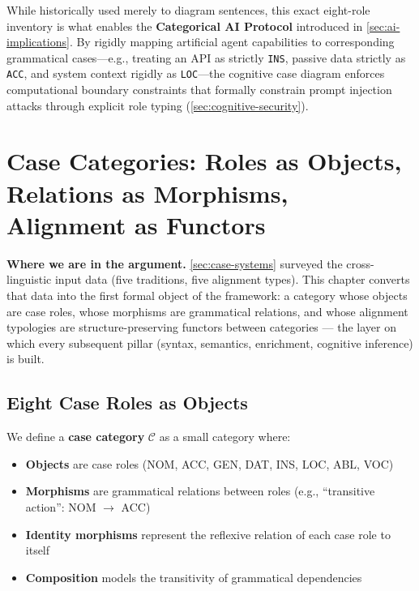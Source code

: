 \documentclass[
]{article}
\providecommand{\tightlist}{%
  \setlength{\itemsep}{0pt}\setlength{\parskip}{0pt}}
\begin{document}
While historically used merely to diagram sentences, this exact
eight-role inventory is what enables the \textbf{Categorical AI
Protocol} introduced in \autoref{sec:ai-implications}. By rigidly
mapping artificial agent capabilities to corresponding grammatical
cases---e.g., treating an API as strictly \texttt{INS}, passive data
strictly as \texttt{ACC}, and system context rigidly as
\texttt{LOC}---the cognitive case diagram enforces computational
boundary constraints that formally constrain prompt injection attacks
through explicit role typing (\autoref{sec:cognitive-security}).

\newpage

\section{Case Categories: Roles as Objects, Relations as Morphisms,
Alignment as Functors}\label{sec:case-categories}

\textbf{Where we are in the argument.} \autoref{sec:case-systems}
surveyed the cross-linguistic input data (five traditions, five
alignment types). This chapter converts that data into the first formal
object of the framework: a category whose objects are case roles, whose
morphisms are grammatical relations, and whose alignment typologies are
structure-preserving functors between categories --- the layer on which
every subsequent pillar (syntax, semantics, enrichment, cognitive
inference) is built.

\subsection{Eight Case Roles as
Objects}\label{eight-case-roles-as-objects}

We define a \textbf{case category} \(\mathcal{C}\) as a small category
where:

\begin{itemize}
\tightlist
\item
  \textbf{Objects} are case roles (NOM, ACC, GEN, DAT, INS, LOC, ABL,
  VOC)
\item
  \textbf{Morphisms} are grammatical relations between roles (e.g.,
  ``transitive action'': NOM \texorpdfstring{\ensuremath{\to}}{->} ACC)
\item
  \textbf{Identity morphisms} represent the reflexive relation of each
  case role to itself
\item
  \textbf{Composition} models the transitivity of grammatical
  dependencies
\end{itemize}
\end{document}
